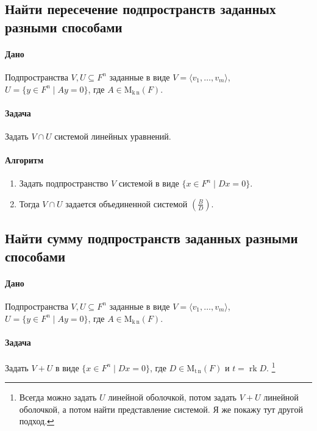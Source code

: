 \documentclass{article}
\newcommand{\MatrixDim}[3]{\operatorname{\mathrm{M}_{#2\,#3}}(#1)}
\newcommand{\rk}{\operatorname{rk}}
\begin{document}
\subsection{Найти пересечение подпространств заданных разными способами}

\paragraph{Дано}

Подпространства $V,U\subseteq F^{n}$ заданные в виде $V =\langle v_1,\ldots,v_m\rangle$, $U = \{y\in F^{n}\mid Ay = 0\}$, где $A\in \MatrixDim{F}{k}{n}$.

\paragraph{Задача}

Задать $V \cap U$ системой линейных уравнений.

\paragraph{Алгоритм}

\begin{enumerate}
\item Задать подпространство $V$ системой в виде $\{x\in F^n \mid Dx = 0\}$.

\item Тогда $V\cap U$ задается объединенной системой $\left(\frac{B}{D}\right)$.
\end{enumerate}


\subsection{Найти сумму подпространств заданных разными способами}

\paragraph{Дано}

Подпространства $V,U\subseteq F^{n}$ заданные в виде $V =\langle v_1,\ldots,v_m\rangle$, $U = \{y\in F^{n}\mid Ay = 0\}$, где $A\in \MatrixDim{F}{k}{n}$.

\paragraph{Задача}

Задать $V + U$ в виде $\{x\in F^n \mid Dx = 0\}$, где $D\in \MatrixDim{F}{t}{n}$ и $t = \rk D$.%
\footnote{Всегда можно задать $U$ линейной оболочкой, потом задать $V+U$ линейной оболочкой, а потом найти представление системой.
Я же покажу тут другой подход.}
\end{document}
